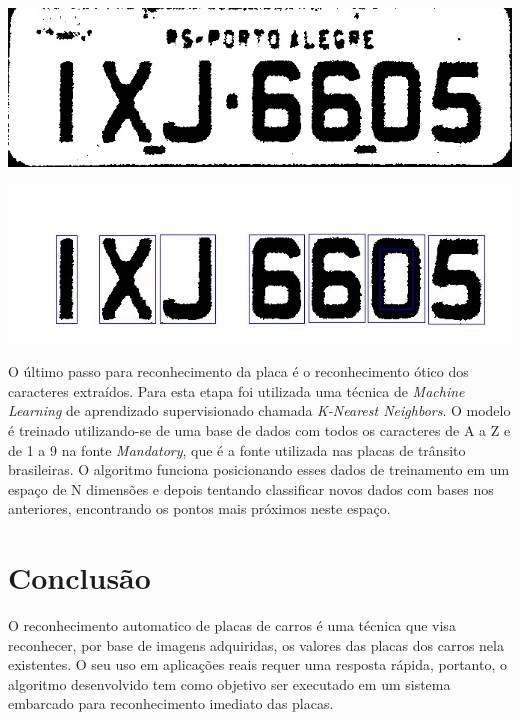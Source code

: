 \documentclass[a0,portrait]{a0poster}
\begin{document}
\begin{multicols}{2}
\vspace{2cm}

\begin{center}
	\includegraphics[width=0.70\linewidth]{a02fill_binary.jpg}
	\label{fig:plate_filled}
\end{center}

\begin{center}
	\includegraphics[width=0.70\linewidth]{character_segmentation.jpg}
	\label{fig:character_segmentation}
\end{center}

O último passo para reconhecimento da placa é o reconhecimento ótico dos
caracteres extraídos. Para esta etapa foi utilizada uma técnica de \emph{Machine Learning}
de aprendizado supervisionado chamada \emph{K-Nearest Neighbors}.
O modelo é treinado utilizando-se de uma base de dados com todos os caracteres
de A a Z e de 1 a 9 na fonte \emph{Mandatory}, que é a fonte utilizada nas placas de
trânsito brasileiras. O algoritmo funciona posicionando esses dados de treinamento
em um espaço de N dimensões e depois tentando classificar novos dados com bases nos anteriores,
encontrando os pontos mais próximos neste espaço.

\color{NavyBlue}
\section*{\huge Conclusão}
\color{Black}

O reconhecimento automatico de placas de carros é uma técnica que visa reconhecer,
por base de imagens adquiridas, os valores das placas dos carros nela existentes.
O seu uso em aplicações reais requer uma resposta rápida, portanto, o algoritmo desenvolvido
tem como objetivo ser executado em um sistema embarcado para reconhecimento imediato das placas.

% 
% 

\end{multicols}

\end{document}
